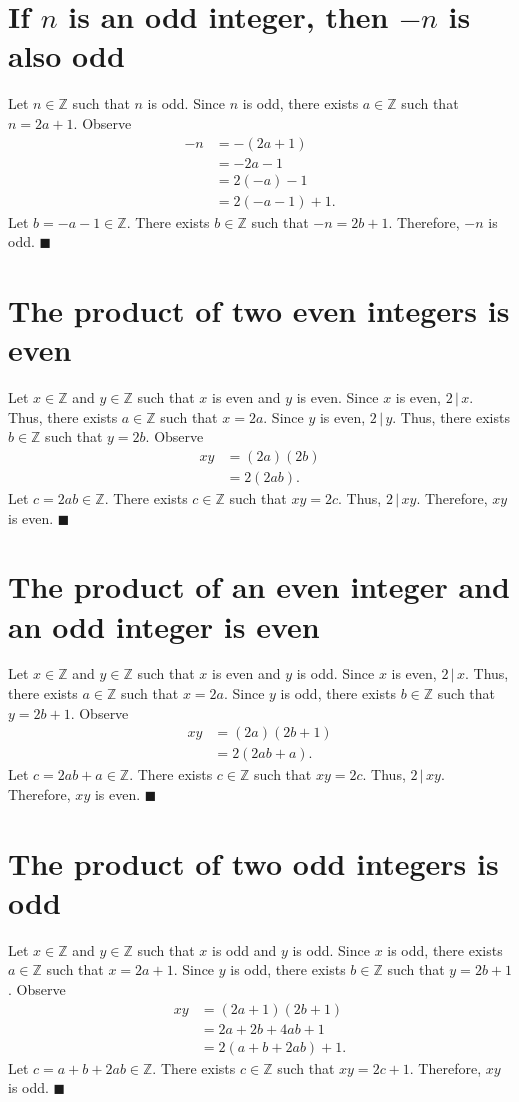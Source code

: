 \documentclass[12pt]{article}
\begin{document}
\section{If $n$ is an odd integer, then $-n$ is also odd}
Let $n\in\mathbb{Z}$ such that $n$ is odd. Since $n$ is odd, there exists $a\in\mathbb{Z}$ such that $n=2a+1$. Observe
\begin{align*}
-n
&=-(2a+1)\\
&=-2a-1\\
&=2(-a)-1\\
&=2(-a-1)+1.
\end{align*}
Let $b=-a-1\in\mathbb{Z}$. There exists $b\in\mathbb{Z}$ such that $-n=2b+1$. Therefore, $-n$ is odd. $\blacksquare$
\section{The product of two even integers is even}
Let $x\in\mathbb{Z}$ and $y\in\mathbb{Z}$ such that $x$ is even and $y$ is even. Since $x$ is even, $2\,|\,x$. Thus, there exists $a\in\mathbb{Z}$ such that $x=2a$. Since $y$ is even, $2\,|\,y$. Thus, there exists $b\in\mathbb{Z}$ such that $y=2b$. Observe
\begin{align*}
xy
&=(2a)(2b)\\
&=2(2ab).
\end{align*}
Let $c=2ab\in\mathbb{Z}$. There exists $c\in\mathbb{Z}$ such that $xy=2c$. Thus, $2\,|\,xy$. Therefore, $xy$ is even. $\blacksquare$
\section{The product of an even integer and an odd integer is even}
Let $x\in\mathbb{Z}$ and $y\in\mathbb{Z}$ such that $x$ is even and $y$ is odd. Since $x$ is even, $2\,|\,x$. Thus, there exists $a\in\mathbb{Z}$ such that $x=2a$. Since $y$ is odd, there exists $b\in\mathbb{Z}$ such that $y=2b+1$. Observe
\begin{align*}
xy
&=(2a)(2b+1)\\
&=2(2ab+a).
\end{align*}
Let $c=2ab+a\in\mathbb{Z}$. There exists $c\in\mathbb{Z}$ such that $xy=2c$. Thus, $2\,|\,xy$. Therefore, $xy$ is even. $\blacksquare$
\section{The product of two odd integers is odd}
Let $x\in\mathbb{Z}$ and $y\in\mathbb{Z}$ such that $x$ is odd and $y$ is odd. Since $x$ is odd, there exists $a\in\mathbb{Z}$ such that $x=2a+1$. Since $y$ is odd, there exists $b\in\mathbb{Z}$ such that $y=2b+1$. Observe
\begin{align*}
xy
&=(2a+1)(2b+1)\\
&=2a+2b+4ab+1\\
&=2(a+b+2ab)+1.
\end{align*}
Let $c=a+b+2ab\in\mathbb{Z}$. There exists $c\in\mathbb{Z}$ such that $xy=2c+1$. Therefore, $xy$ is odd. $\blacksquare$
\end{document}
